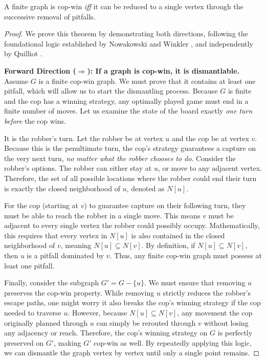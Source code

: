 \documentclass[12pt, a4paper]{article}
\begin{document}
\begin{theorem}{}{}
A finite graph is cop-win \textit{iff} it can be reduced to a single vertex through the successive removal of pitfalls.
\end{theorem}
\begin{proof}
    We prove this theorem by demonstrating both directions, following the foundational logic established by Nowakowski and Winkler \cite{nowakowski1983vertex}, and independently by Quilliot \cite{quilliot1983jeux}.

    \vspace{0.3cm}
    \noindent\textbf{Forward Direction ($\Rightarrow$): If a graph is cop-win, it is dismantlable.} \\
    Assume $G$ is a finite cop-win graph. We must prove that it contains at least one pitfall, which will allow us to start the dismantling process. Because $G$ is finite and the cop has a winning strategy, any optimally played game must end in a finite number of moves. Let us examine the state of the board exactly \textit{one turn before} the cop wins. 
    
    It is the robber's turn. Let the robber be at vertex $u$ and the cop be at vertex $v$. Because this is the penultimate turn, the cop's strategy guarantees a capture on the very next turn, \textit{no matter what the robber chooses to do}. Consider the robber's options. The robber can either stay at $u$, or move to any adjacent vertex. Therefore, the set of all possible locations where the robber could end their turn is exactly the closed neighborhood of $u$, denoted as $N[u]$.
    
    For the cop (starting at $v$) to guarantee capture on their following turn, they must be able to reach the robber in a single move. This means $v$ must be adjacent to every single vertex the robber could possibly occupy. Mathematically, this requires that every vertex in $N[u]$ is also contained in the closed neighborhood of $v$, meaning $N[u] \subseteq N[v]$. By definition, if $N[u] \subseteq N[v]$, then $u$ is a pitfall dominated by $v$. Thus, any finite cop-win graph must possess at least one pitfall. 
    
    Finally, consider the subgraph $G' = G - \{u\}$. We must ensure that removing $u$ preserves the cop-win property. While removing $u$ strictly reduces the robber's escape paths, one might worry it also breaks the cop's winning strategy if the cop needed to traverse $u$. However, because $N[u] \subseteq N[v]$, any movement the cop originally planned through $u$ can simply be rerouted through $v$ without losing any adjacency or reach. Therefore, the cop's winning strategy on $G$ is perfectly preserved on $G'$, making $G'$ cop-win as well. By repeatedly applying this logic, we can dismantle the graph vertex by vertex until only a single point remains.
    

\end{proof}
\end{document}
